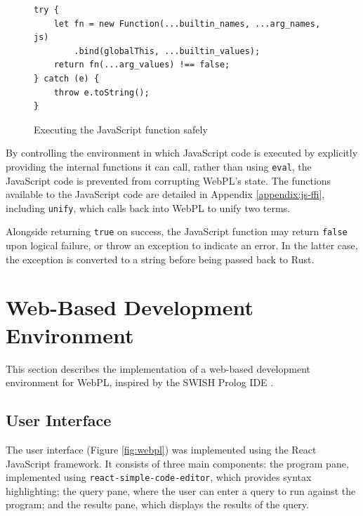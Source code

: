 \begin{figure}[H]
\centering
\begin{verbatim}
try {
    let fn = new Function(...builtin_names, ...arg_names, js)
        .bind(globalThis, ...builtin_values);
    return fn(...arg_values) !== false;
} catch (e) {
    throw e.toString();
}
\end{verbatim}
\caption{Executing the JavaScript function safely}
\label{fig:js-execution}
\end{figure}

By controlling the environment in which JavaScript code is executed by explicitly providing the internal functions it can call, rather than using \texttt{eval}, the JavaScript code is prevented from corrupting WebPL's state. The functions available to the JavaScript code are detailed in Appendix \ref{appendix:js-ffi}, including \texttt{unify}, which calls back into WebPL to unify two terms.

Alongside returning \texttt{true} on success, the JavaScript function may return \texttt{false} upon logical failure, or throw an exception to indicate an error. In the latter case, the exception is converted to a string before being passed back to Rust.

\section{Web-Based Development Environment}

\label{sec:web-dev-env}

This section describes the implementation of a web-based development environment for WebPL, inspired by the SWISH Prolog IDE \cite{wielemakerSWISHSWIPrologSharing2015}.

\subsection{User Interface}

The user interface (Figure \ref{fig:webpl}) was implemented using the React JavaScript framework. It consists of three main components: the program pane, implemented using \texttt{react-simple-code-editor}, which provides syntax highlighting; the query pane, where the user can enter a query to run against the program; and the results pane, which displays the results of the query.

